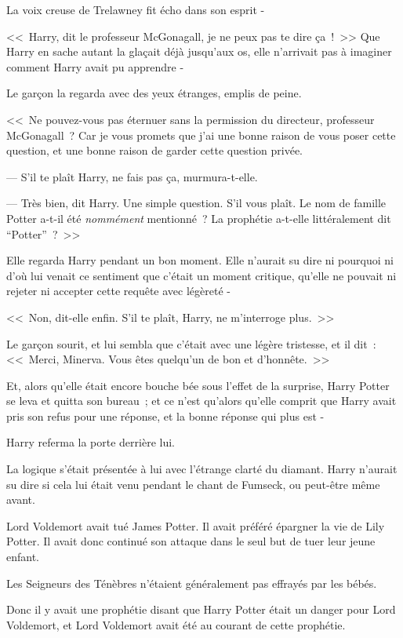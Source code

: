 La voix creuse de Trelawney fit écho dans son esprit -

<<~Harry, dit le professeur McGonagall, je ne peux pas te dire ça~!~>> Que Harry en sache autant la glaçait déjà jusqu'aux os, elle n'arrivait pas à imaginer comment Harry avait pu apprendre -

Le garçon la regarda avec des yeux étranges, emplis de peine.

<<~Ne pouvez-vous pas éternuer sans la permission du directeur, professeur McGonagall~? Car je vous promets que j'ai une bonne raison de vous poser cette question, et une bonne raison de garder cette question privée.

--- S'il te plaît Harry, ne fais pas ça, murmura-t-elle.

--- Très bien, dit Harry. Une simple question. S'il vous plaît. Le nom de famille Potter a-t-il été \emph{nommément} mentionné~? La prophétie a-t-elle littéralement dit “Potter”~?~>>

Elle regarda Harry pendant un bon moment. Elle n'aurait su dire ni pourquoi ni d'où lui venait ce sentiment que c'était un moment critique, qu'elle ne pouvait ni rejeter ni accepter cette requête avec légèreté -

<<~Non, dit-elle enfin. S'il te plaît, Harry, ne m'interroge plus.~>>

Le garçon sourit, et lui sembla que c'était avec une légère tristesse, et il dit~: <<~Merci, Minerva. Vous êtes quelqu'un de bon et d'honnête.~>>

Et, alors qu'elle était encore bouche bée sous l'effet de la surprise, Harry Potter se leva et quitta son bureau~; et ce n'est qu'alors qu'elle comprit que Harry avait pris son refus pour une réponse, et la bonne réponse qui plus est -

Harry referma la porte derrière lui.

La logique s'était présentée à lui avec l'étrange clarté du diamant. Harry n'aurait su dire si cela lui était venu pendant le chant de Fumseck, ou peut-être même avant.

Lord Voldemort avait tué James Potter. Il avait préféré épargner la vie de Lily Potter. Il avait donc continué son attaque dans le seul but de tuer leur jeune enfant.

Les Seigneurs des Ténèbres n'étaient généralement pas effrayés par les bébés.

Donc il y avait une prophétie disant que Harry Potter était un danger pour Lord Voldemort, et Lord Voldemort avait été au courant de cette prophétie.

